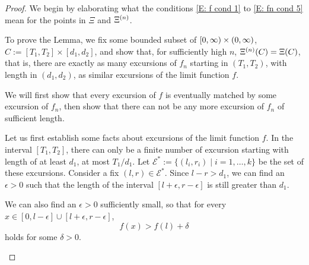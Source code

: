 \begin{proof}
We begin by elaborating what the conditions
\eqref{E: f cond 1} to \eqref{E: fn cond 5}
mean for the points in
$\Xi$ and $\Xi^{(n)}$.

To prove the Lemma, 
we fix some bounded subset of
$[0, \infty) \times (0, \infty)$,
$C := [T_1, T_2] \times [d_1, d_2]$,
and show that, for sufficiently high $n$,
$\Xi^{(n)}(C) = \Xi(C)$,
that is,
there are exactly as many excursions of $f_n$ starting in
$(T_1, T_2)$, 
with length in $(d_1, d_2)$,
as similar excursions of the limit function $f$.

We will first show that every excursion of $f$ is eventually matched by some excursion of $f_n$,
then show that there can not be any more excursion of $f_n$ of sufficient length.


\begin{proofpart} \label{PP: Lemma 7 1}

Let us first establish some facts about excursions of the limit function $f$.
In the interval $[T_1, T_2]$,
there can only be a finite number of excursion starting with length of at least $d_1$,
at most $T_1/d_1$.
Let
$ \mathcal{E}^* := \{ (l_i, r_i) \; | \; i=1, \dots, k \} $
be the set of these excursions.
Consider a fix
$(l,r) \in \mathcal{E}^*$.
Since $l-r > d_1$,
we can find an $\epsilon > 0$
such that the length of the interval
$[l+\epsilon, r-\epsilon]$
is still greater than $d_1$.

We can also find an $\epsilon > 0$ sufficiently small,
so that for every
$x \in [0, l-\epsilon] \cup [l+\epsilon, r-\epsilon]$,
\begin{equation} \label{E: fx > fl + delta}
f(x) > f(l) + \delta
\end{equation}
holds for some $\delta > 0$.


\end{proofpart}
\end{proof}
